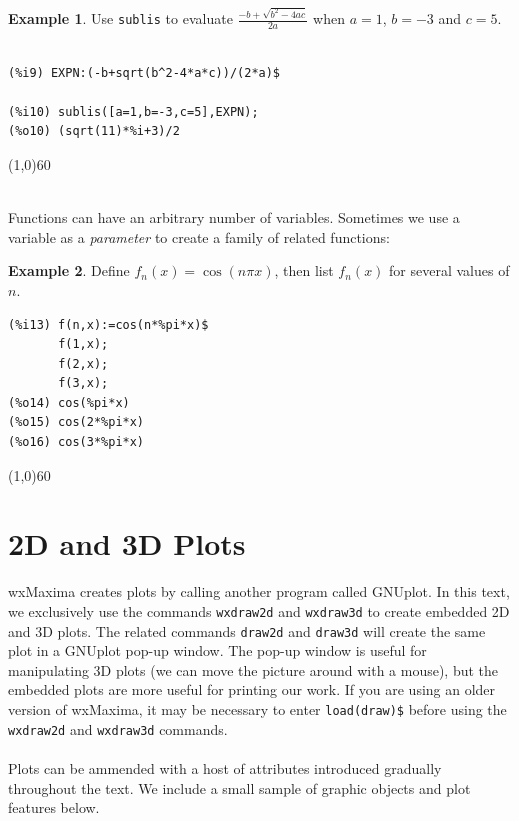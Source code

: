 \documentclass[10.5pt,twoside]{report}
\theoremstyle{definition}
\newtheorem{exmp}{Example}[section]
\begin{document}
\begin{exmp} Use \verb|sublis| to evaluate $\frac{-b+\sqrt{b^2-4ac}}{2a}$ when $a=1$, $b=-3$ and $c=5$.\\
${}$\\
\begin{verbatim}
(%i9) EXPN:(-b+sqrt(b^2-4*a*c))/(2*a)$

(%i10) sublis([a=1,b=-3,c=5],EXPN);
(%o10) (sqrt(11)*%i+3)/2
\end{verbatim}

\end{exmp}

\line(1,0){60}
\linethickness{0.5mm}

${}$\\

Functions can have an arbitrary number of variables.  Sometimes we use a variable as a \textit{parameter} to create a family of related functions:

\begin{exmp} Define $f_n(x)=\cos{(n\pi x)}$, then list $f_n(x)$ for several values of $n$.\\


\begin{verbatim}
(%i13) f(n,x):=cos(n*%pi*x)$
       f(1,x);
       f(2,x);
       f(3,x);
(%o14) cos(%pi*x)
(%o15) cos(2*%pi*x)
(%o16) cos(3*%pi*x)
\end{verbatim}

\end{exmp}


\line(1,0){60}
\linethickness{0.5mm}



\pagebreak


\section{2D and 3D Plots}\label{2D and 3D Plots}

wxMaxima creates plots by calling another program called GNUplot.  In this text, we exclusively use the commands \verb|wxdraw2d| and \verb|wxdraw3d| to create embedded 2D and 3D plots.  The related commands \verb|draw2d| and \verb|draw3d| will create the same plot in a GNUplot pop-up window.  The pop-up window is useful for manipulating 3D plots (we can move the picture around with a mouse), but the embedded plots are more useful for printing our work.  If you are using an older version of wxMaxima, it may be necessary to enter \verb|load(draw)$| before using the \verb|wxdraw2d| and \verb|wxdraw3d| commands.\\
${}$\\
Plots can be ammended with a host of attributes introduced gradually throughout the text.  We include a small sample of graphic objects and plot features below.
\end{document}
